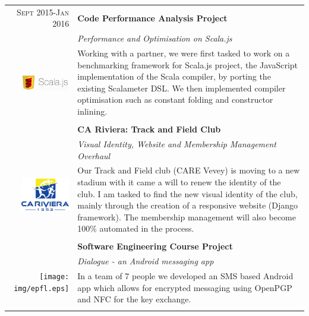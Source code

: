 \documentclass[a4paper,11pt]{article} %
\begin{document}
\begin{tabularx}{\textwidth}{r|X}


\textsc{Sept 2015-Jan 2016} & \textbf{Code Performance Analysis Project} \\
\multirow{4}{*}{ \includegraphics[width=60pt]{img/scalajs.png}}
& \emph{Performance and Optimisation on Scala.js}\\ 
& \footnotesize{Working with a partner, we were first tasked to work on a
benchmarking framework for Scala.js project, the JavaScript implementation of
the Scala compiler, by porting the existing Scalameter DSL.
We then implemented compiler optimisation such as constant folding and
constructor inlining.}\\
\multicolumn{2}{c}{} \\


\textsc{Mai 2015-March 2016} & \textbf{CA Riviera: Track and Field Club} \\
\multirow{4}{*}{ \includegraphics[width=60pt]{img/cariviera.eps}}
& \emph{Visual Identity, Website and Membership Management Overhaul}\\ 
& \footnotesize{Our Track and Field club (CARE Vevey) is moving to a new stadium with it came a will to renew the identity of the club.
I am tasked to find the new visual identity of the club, mainly through the creation of a responsive website (Django framework).
The membership management will also become 100\% automated in the process.}\\
\multicolumn{2}{c}{} \\


\textsc{Sept-Dec 2014} & \textbf{Software Engineering Course Project} \\
\multirow{4}{*}{ \texttt{[image: img/epfl.eps]}}
& \emph{Dialogue - an Android messaging app}\\ 
& \footnotesize{In a team of 7 people we developed an SMS based Android app which allows for encrypted messaging using OpenPGP
and NFC for the key exchange.}\\
\multicolumn{2}{c}{} \\


\end{tabularx}
\end{document}
